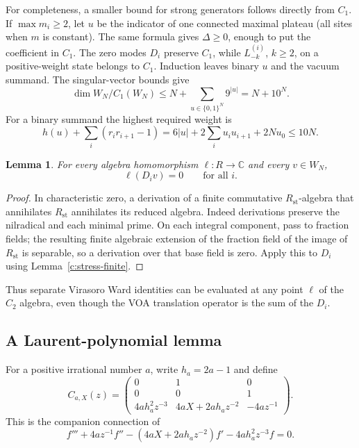 \documentclass[11pt,a4paper]{article}
\numberwithin{equation}{section}
\newtheorem{lemma}[theorem]{Lemma}
\theoremstyle{definition}\newtheorem{definition}[theorem]{Definition}
\theoremstyle{remark}\newtheorem{remark}[theorem]{Remark}
\newcommand{\C}{\mathbb C}\newcommand{\Z}{\mathbb Z}\newcommand{\Q}{\mathbb Q}
\begin{document}
For completeness, a smaller bound for strong generators follows directly from $C_1$. If $\max m_i\ge2$, let $u$ be the indicator of one connected maximal plateau (all sites when $m$ is constant). The same formula gives $\Delta\ge0$, enough to put the coefficient in $C_1$. The zero modes $D_i$ preserve $C_1$, while $L^{(i)}_{-k}$, $k\ge2$, on a positive-weight state belongs to $C_1$. Induction leaves binary $u$ and the vacuum summand. The singular-vector bounds give
\[
 \dim W_N/C_1(W_N)\le N+\sum_{u\in\{0,1\}^N}9^{|u|}=N+10^N.
\]
For a binary summand the highest required weight is
\[
 h(u)+\sum_i(r_ir_{i+1}-1)
 =6|u|+2\sum_i u_i u_{i+1}+2Nu_0\le10N.
\]

\begin{lemma}\label{c:partial-translations}
For every algebra homomorphism $\ell:R\to\C$ and every $v\in W_N$,
\[
 \ell(D_i v)=0\qquad\text{for all }i.
\]
\end{lemma}
\begin{proof}
In characteristic zero, a derivation of a finite commutative $R_{\mathrm{st}}$-algebra that annihilates $R_{\mathrm{st}}$ annihilates its reduced algebra. Indeed derivations preserve the nilradical and each minimal prime. On each integral component, pass to fraction fields; the resulting finite algebraic extension of the fraction field of the image of $R_{\mathrm{st}}$ is separable, so a derivation over that base field is zero. Apply this to $D_i$ using Lemma~\ref{c:stress-finite}.
\end{proof}
Thus separate Virasoro Ward identities can be evaluated at any point
$\ell$ of the $C_2$ algebra, even though the VOA translation operator
is the sum of the $D_i$.

\subsection*{A Laurent-polynomial lemma}
For a positive irrational number $a$, write $h_a=2a-1$ and define
\[
 C_{a,X}(z)=
 \begin{pmatrix}
 0&1&0\\0&0&1\\
 4ah_a^2z^{-3}&4aX+2ah_a z^{-2}&-4az^{-1}
 \end{pmatrix}.
\]
This is the companion connection of
\begin{equation}\label{c:scalar-ode}
 f'''+4az^{-1}f''-(4aX+2ah_a z^{-2})f'-4ah_a^2z^{-3}f=0.
\end{equation}
\end{document}
